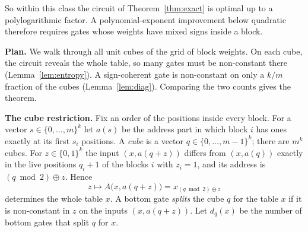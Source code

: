\documentclass[11pt,letterpaper]{article}
\theoremstyle{remark}
\newcommand{\bits}{\{0,1\}}
\newcommand{\smalltitle}[1]{\textbf{\color{ink}#1}\quad}
\begin{document}
So within this class the circuit of Theorem~\ref{thm:exact} is optimal up to a
polylogarithmic factor. A polynomial-exponent improvement below quadratic therefore requires
gates whose weights have mixed signs inside a block.

\smalltitle{Plan.}
We walk through all unit cubes of the grid of block weights. On each cube,
the circuit reveals the whole table, so many gates must be non-constant there
(Lemma~\ref{lem:entropy}). A sign-coherent gate is non-constant on only a
$k/m$ fraction of the cubes (Lemma~\ref{lem:diag}). Comparing the two counts
gives the theorem.

\smalltitle{The cube restriction.}
Fix an order of the positions inside every block. For a vector
$s\in\{0,\dots,m\}^k$ let $a(s)$ be the address part in which block $i$ has
ones exactly at its first $s_i$ positions. A \emph{cube} is a vector
$q\in\{0,\dots,m-1\}^k$; there are $m^k$ cubes. For $z\in\bits^k$ the input
$(x,a(q+z))$ differs from $(x,a(q))$ exactly in the live positions
$q_i+1$ of the blocks $i$ with $z_i=1$, and its address is
$(q\bmod2)\oplus z$. Hence
\[
z\mapsto A\bigl(x,a(q+z)\bigr)=x_{(q\bmod 2)\oplus z}
\]
determines the whole table $x$. A bottom gate \emph{splits} the cube $q$ for
the table $x$ if it is non-constant in $z$ on the inputs $(x,a(q+z))$. Let
$d_q(x)$ be the number of bottom gates that split $q$ for $x$.
\end{document}
